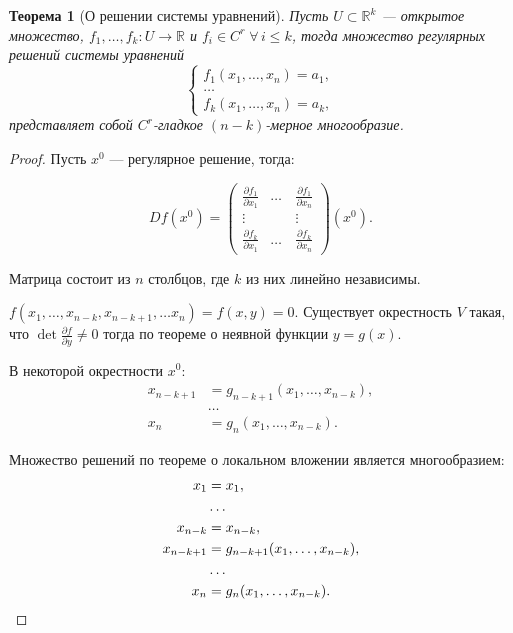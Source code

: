 \documentclass[a5paper]{article}
\newcounter{through}
\theoremstyle{plain}
\newtheorem{theorem}[through]{Теорема}
\theoremstyle{definition}
\numberwithin{through}{section}
\numberwithin{equation}{section}
\begin{document}
\begin{theorem}[О решении системы уравнений]
	Пусть $U \subset \mathbb{R}^k$ --- открытое множество, $f_1, \ldots, f_k :
	U \to \mathbb{R}$ и $f_i \in C^r \; \forall \, i \leq k$, тогда множество регулярных решений системы уравнений
	\begin{equation*}
	\begin{cases}
	f_1(x_1, \ldots, x_n) = a_1,
	\\
	\ldots
	\\
	f_k(x_1, \ldots, x_n) = a_k,
	\end{cases}
	\end{equation*}
	представляет собой $C^r$-гладкое $(n-k)$-мерное многообразие.
\end{theorem}
\begin{proof}	
	Пусть $x^0$ --- регулярное решение, тогда:
	
	\begin{equation*}
	D f(x^0) = \begin{pmatrix}
	\frac{\partial f_1}{ \partial x_1}& \ldots& \frac{\partial f_1}{ \partial x_n} \\
	\vdots& \quad& \vdots \\
	\frac{\partial f_k}{ \partial x_1}& \ldots& \frac{\partial f_k}{ \partial x_n}
	\end{pmatrix} (x^0).
	\end{equation*}
	
	Матрица состоит из $n$ столбцов, где $k$ из них линейно независимы.
	
	$f(x_1,\ldots,x_{n-k},x_{n - k +1}, \ldots x_{n}) = f(x,y) = 0$. Существует окрестность $V$ такая, что 
	$\det \frac{\partial f}{\partial y} \ne 0$ тогда по теореме о неявной функции $y = g(x)$. 
	
	
	В некоторой окрестности $x^0$:	
\begin{align*}
	x_{n-k+1} &= g_{n-k+1}(x_1, \ldots, x_{n-k}), \\
	& \ldots \\
	x_n &= g_n(x_1, \ldots, x_{n-k}).
\end{align*}

	Множество решений по теореме о локальном вложении является многообразием:
\begin{align*}
	x_1 &= x_1, \\
	& \ldots \\
	x_{n - k} &= x_{n - k}, \\
	x_{n-k+1} & = g_{n-k+1}(x_1, \ldots, x_{n-k}), \\
	& \ldots \\
	x_n &= g_n(x_1, \ldots, x_{n-k}).
	\qedhere
\end{align*}
\end{proof}
\end{document}
